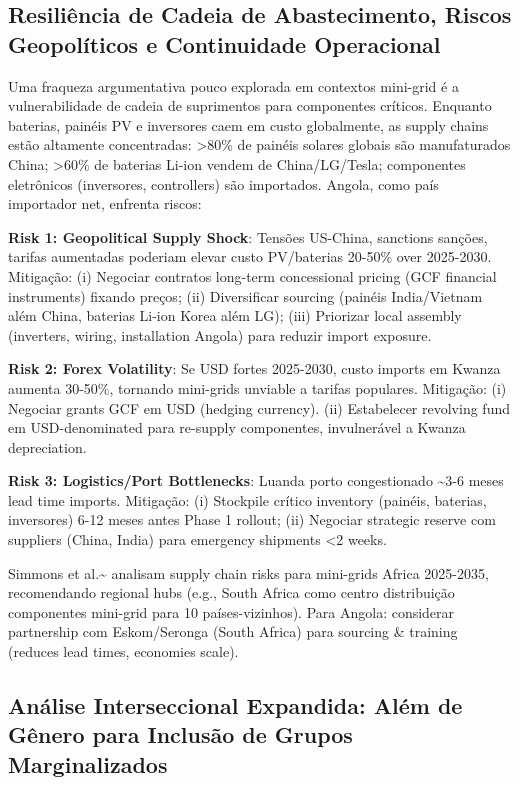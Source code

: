 \documentclass[12pt, a4paper]{article}
\begin{document}
\subsection{Resiliência de Cadeia de Abastecimento, Riscos Geopolíticos e Continuidade Operacional}

Uma fraqueza argumentativa pouco explorada em contextos mini-grid é a vulnerabilidade de cadeia de suprimentos para componentes críticos. Enquanto baterias, painéis PV e inversores caem em custo globalmente, as supply chains estão altamente concentradas: >80\% de painéis solares globais são manufaturados China; >60\% de baterias Li-ion vendem de China/LG/Tesla; componentes eletrônicos (inversores, controllers) são importados. Angola, como país importador net, enfrenta riscos:

\textbf{Risk 1: Geopolitical Supply Shock}: Tensões US-China, sanctions sanções, tarifas aumentadas poderiam elevar custo PV/baterias 20-50\% over 2025-2030. Mitigação: (i) Negociar contratos long-term concessional pricing (GCF financial instruments) fixando preços; (ii) Diversificar sourcing (painéis India/Vietnam além China, baterias Li-ion Korea além LG); (iii) Priorizar local assembly (inverters, wiring, installation Angola) para reduzir import exposure.

\textbf{Risk 2: Forex Volatility}: Se USD fortes 2025-2030, custo imports em Kwanza aumenta 30-50\%, tornando mini-grids unviable a tarifas populares. Mitigação: (i) Negociar grants GCF em USD (hedging currency). (ii) Estabelecer revolving fund em USD-denominated para re-supply componentes, invulnerável a Kwanza depreciation.

\textbf{Risk 3: Logistics/Port Bottlenecks}: Luanda porto congestionado \textasciitilde{}3-6 meses lead time imports. Mitigação: (i) Stockpile crítico inventory (painéis, baterias, inversores) 6-12 meses antes Phase 1 rollout; (ii) Negociar strategic reserve com suppliers (China, India) para emergency shipments <2 weeks.

Simmons et al.\textasciitilde{}\citep{Simmons2025} analisam supply chain risks para mini-grids Africa 2025-2035, recomendando regional hubs (e.g., South Africa como centro distribuição componentes mini-grid para 10 países-vizinhos). Para Angola: considerar partnership com Eskom/Seronga (South Africa) para sourcing \& training (reduces lead times, economies scale).

\subsection{Análise Interseccional Expandida: Além de Gênero para Inclusão de Grupos Marginalizados}
\end{document}
